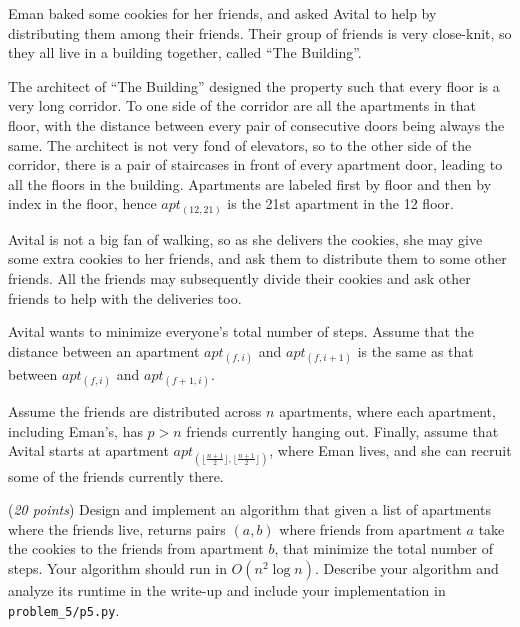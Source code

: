 \documentclass{hw_template}
\newcommand{\floor}[1]{\lfloor #1 \rfloor}
\begin{document}
\begin{problem}
  Eman baked some cookies for her friends, and asked Avital to help
  by distributing them among their friends. 
  Their group of friends is very close-knit, so they all live in a building 
  together, called ``The Building''.
  
  The architect of ``The Building'' designed 
  the property such that every floor is a very long corridor. To one side of 
  the corridor are all the apartments in that floor, with the distance between 
  every pair of consecutive doors being always the same.   
  The architect is not very fond of elevators, so to the other side of the 
  corridor, there is a pair of staircases in front of every apartment door,
  leading to all the floors in the building. 
  Apartments are labeled first by floor and then by index in the floor, hence 
  $apt_{(12,21)}$ is the 21st apartment in the 12 floor.

  Avital is not a big fan of walking, so as she delivers the cookies,
  she may give some extra cookies to her friends, and ask them to
  distribute them to some other friends. All the friends may subsequently
  divide their cookies and ask other friends to help with the deliveries too. 
  
  Avital wants to minimize everyone's total number of steps. Assume that the distance between an apartment $apt_{(f,i)}$ and $apt_{(f,i+1)}$ is the same as that between $apt_{(f,i)}$ and $apt_{(f+1,i)}$. 
  
  Assume the friends are distributed across $n$ apartments,
  where each apartment, including Eman's, has $p > n$ friends
  currently hanging out. 
  Finally, assume that Avital starts at apartment $apt_{(\floor{\frac{n+1}{2}},\floor{\frac{n+1}{2}})}$,
  where Eman lives, and she can recruit some of the friends currently there.

  (\textit{20 points}) Design and implement an algorithm that given a list of apartments where the friends live, returns pairs $(a, b)$ where friends from apartment $a$ take the cookies to the friends from apartment $b$, that minimize the total number of steps. Your algorithm should run in $O(n^2 \log n)$.
  Describe your algorithm and analyze its runtime in the write-up and include your implementation in \texttt{problem\_5/p5.py}.


\end{problem}
\end{document}
